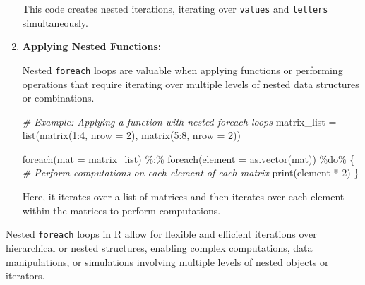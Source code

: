 \documentclass[
]{article}
\newenvironment{Shaded}{}{}
\newcommand{\AttributeTok}[1]{\textcolor[rgb]{0.49,0.56,0.16}{#1}}
\newcommand{\CommentTok}[1]{\textcolor[rgb]{0.38,0.63,0.69}{\textit{#1}}}
\newcommand{\DecValTok}[1]{\textcolor[rgb]{0.25,0.63,0.44}{#1}}
\newcommand{\FunctionTok}[1]{\textcolor[rgb]{0.02,0.16,0.49}{#1}}
\newcommand{\NormalTok}[1]{#1}
\newcommand{\OtherTok}[1]{\textcolor[rgb]{0.00,0.44,0.13}{#1}}
\newcommand{\SpecialCharTok}[1]{\textcolor[rgb]{0.25,0.44,0.63}{#1}}
\begin{document}
\begin{enumerate}
  This code creates nested iterations, iterating over \texttt{values}
  and \texttt{letters} simultaneously.
\item
  \textbf{Applying Nested Functions:}

  Nested \texttt{foreach} loops are valuable when applying functions or
  performing operations that require iterating over multiple levels of
  nested data structures or combinations.

\begin{Shaded}
\begin{Highlighting}[]
\CommentTok{\# Example: Applying a function with nested foreach loops}
\NormalTok{matrix\_list }\OtherTok{=} \FunctionTok{list}\NormalTok{(}\FunctionTok{matrix}\NormalTok{(}\DecValTok{1}\SpecialCharTok{:}\DecValTok{4}\NormalTok{, }\AttributeTok{nrow =} \DecValTok{2}\NormalTok{), }\FunctionTok{matrix}\NormalTok{(}\DecValTok{5}\SpecialCharTok{:}\DecValTok{8}\NormalTok{, }\AttributeTok{nrow =} \DecValTok{2}\NormalTok{))}

\FunctionTok{foreach}\NormalTok{(}\AttributeTok{mat =}\NormalTok{ matrix\_list) }\SpecialCharTok{\%:\%} \FunctionTok{foreach}\NormalTok{(}\AttributeTok{element =} \FunctionTok{as.vector}\NormalTok{(mat)) }\SpecialCharTok{\%do\%}\NormalTok{ \{}
  \CommentTok{\# Perform computations on each element of each matrix}
  \FunctionTok{print}\NormalTok{(element }\SpecialCharTok{*} \DecValTok{2}\NormalTok{)}
\NormalTok{\}}
\end{Highlighting}
\end{Shaded}

  Here, it iterates over a list of matrices and then iterates over each
  element within the matrices to perform computations.
\end{enumerate}

Nested \texttt{foreach} loops in R allow for flexible and efficient
iterations over hierarchical or nested structures, enabling complex
computations, data manipulations, or simulations involving multiple
levels of nested objects or iterators.
\end{document}
